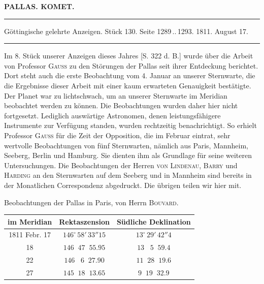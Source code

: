 \clearpage{}\hypertarget{native-332-lower}{}\label{native-332-lower}
\begin{center}\textbf{PALLAS. KOMET.}\par\vspace{4pt}\hrule\vspace{4pt}\fontsize{10}{12}\selectfont Göttingische gelehrte Anzeigen. Stück 130. Seite 1289\,..\,1293. 1811. August 17.\par\vspace{4pt}\hrule\vspace{4pt}\end{center}

\par\indent Im 8. Stück unserer Anzeigen dieses Jahres [S. 322 d. B.] wurde über die Arbeit von Professor \textsc{Gauss} zu den Störungen der Pallas seit ihrer Entdeckung berichtet. Dort steht auch die erste Beobachtung vom 4. Januar an unserer Sternwarte, die die Ergebnisse dieser Arbeit mit einer kaum erwarteten Genauigkeit bestätigte. Der Planet war zu lichtschwach, um an unserer Sternwarte im Meridian beobachtet werden zu können. Die Beobachtungen wurden daher hier nicht fortgesetzt. Lediglich auswärtige Astronomen, denen leistungsfähigere Instrumente zur Verfügung standen, wurden rechtzeitig benachrichtigt. So erhielt Professor \textsc{Gauss} für die Zeit der Opposition, die im Februar eintrat, sehr wertvolle Beobachtungen von fünf Sternwarten, nämlich aus Paris, Mannheim, Seeberg, Berlin und Hamburg. Sie dienten ihm als Grundlage für seine weiteren Untersuchungen. Die Beobachtungen der Herren \textsc{von Lindenau}, \textsc{Barry} und \textsc{Harding} an den Sternwarten auf dem Seeberg und in Mannheim sind bereits in der Monatlichen Correspondenz abgedruckt. Die übrigen teilen wir hier mit.

\begin{center}\fontsize{10}{12}\selectfont\setlength{\tabcolsep}{4pt}\renewcommand{\arraystretch}{1.15}
Beobachtungen der Pallas in Paris, von Herrn \textsc{Bouvard}.

\begin{tabular}{c|c|c}
im Meridian & Rektaszension & Südliche Deklination \\
\hline
1811 Febr. 17 & $146^\circ\,58'\,33''15$ & $13^\circ\,29'\,42''4$ \\
18 & $146\;\;47\;\;55.95$ & $13\;\;\;5\;\;59.4$ \\
22 & $146\;\;\;6\;\;27.90$ & $11\;\;28\;\;19.6$ \\
27 & $145\;\;18\;\;13.65$ & $9\;\;19\;\;32.9$ \\
\end{tabular}
\end{center}


